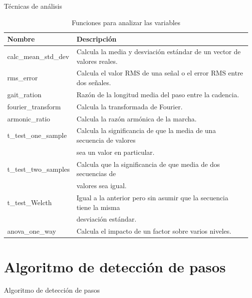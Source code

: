 \documentclass{beamer} %
\newcommand{\mono}[1]{{\ttfamily #1}}
\begin{document}
\begin{frame}{Técnicas de análisis}
\begin{table}
    \centering
    \caption{Funciones para analizar las variables}
    \label{tab:analytics}
    \scriptsize
    \begin{tabular}{ll}
        \toprule
        Nombre & Descripción \\
        \midrule
        \mono{calc\_mean\_std\_dev} & Calcula la media y desviación estándar de un vector de valores reales. \\
        \mono{rms\_error} & Calcula el valor RMS de una señal o el error RMS entre dos señales. \\
        \mono{gait\_ration} & Razón de la longitud media del paso entre la cadencia. \\
        \mono{fourier\_transform} & Calcula la transformada de Fourier. \\
        \mono{armonic\_ratio} & Calcula la razón armónica de la marcha. \\
        \mono{t\_test\_one\_sample} & Calcula la significancia de que la media de una secuencia de valores \\ &  sea un valor en particular. \\
        \mono{t\_test\_two\_samples} & Calcula que la significancia de que media de dos secuencias de \\ & valores sea igual. \\
        \mono{t\_test\_Welcth} & Igual a la anterior pero sin asumir que la secuencia tiene la misma \\ & desviación estándar. \\
        \mono{anova\_one\_way} & Calcula el impacto de un factor sobre varios niveles. \\
        \bottomrule
    \end{tabular}
\end{table}
\end{frame}

\section{Algoritmo de detección de pasos}

\begin{frame}{Algoritmo de detección de pasos}
    
\end{frame}
\end{document}
